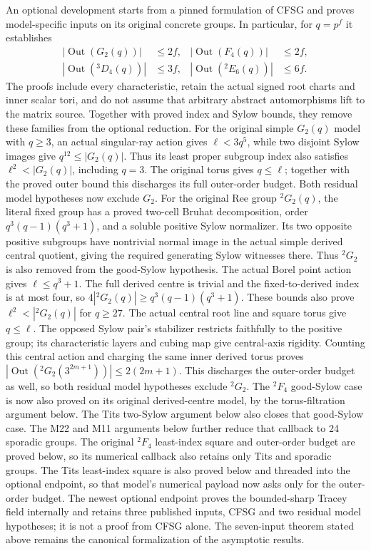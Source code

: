 An optional development starts from a pinned formulation of CFSG and
proves model-specific inputs on its original concrete groups. In
particular, for $q=p^f$ it establishes
\[
 \begin{aligned}
 |\operatorname{Out}(G_2(q))|&\leq2f,&
 |\operatorname{Out}(F_4(q))|&\leq2f,\\
 |\operatorname{Out}({}^3D_4(q))|&\leq3f,&
 |\operatorname{Out}({}^2E_6(q))|&\leq6f.
 \end{aligned}
\]
The proofs include every characteristic, retain the actual signed root
charts and inner scalar tori, and do not assume that arbitrary abstract
automorphisms lift to the matrix source. Together with proved index and
Sylow bounds, they remove these families from the optional reduction.
For the original simple $G_2(q)$ model with $q\geq3$, an actual
singular-ray action gives $\ell<3q^5$, while two disjoint Sylow images
give $q^{12}\leq|G_2(q)|$. Thus its least proper subgroup index also
satisfies $\ell^2<|G_2(q)|$, including $q=3$. The original torus gives
$q\leq\ell$; together with the proved outer bound this discharges its
full outer-order budget. Both residual model hypotheses now exclude
$G_2$. For the original Ree group ${}^2G_2(q)$, the literal fixed group
has a proved two-cell Bruhat decomposition, order
$q^3(q-1)(q^3+1)$, and a soluble positive Sylow normalizer. Its two
opposite positive subgroups have nontrivial normal image in the actual
simple derived central quotient, giving the required generating Sylow
witnesses there. Thus ${}^2G_2$ is also removed from the good-Sylow
hypothesis. The actual Borel point action gives $\ell\leq q^3+1$.
The full derived centre is trivial and the fixed-to-derived index is at
most four, so
$4|{}^2G_2(q)|\geq q^3(q-1)(q^3+1)$. These bounds also prove
$\ell^2<|{}^2G_2(q)|$ for $q\geq27$. The actual central root line
and square torus give $q\leq\ell$. The opposed Sylow pair's stabilizer
restricts faithfully to the positive group; its characteristic layers
and cubing map give central-axis rigidity. Counting this central action
and charging the same inner derived torus proves
$|\operatorname{Out}({}^2G_2(3^{2m+1}))|\leq2(2m+1)$.
This discharges the outer-order budget as well, so both residual model
hypotheses exclude ${}^2G_2$. The ${}^2F_4$ good-Sylow case is now also
proved on its original derived-centre model, by the torus-filtration
argument below. The Tits two-Sylow argument below also closes that
good-Sylow case. The M22 and M11 arguments below further reduce that
callback to 24 sporadic groups. The original ${}^2F_4$ least-index square and
outer-order budget are proved below, so its numerical callback also
retains only Tits and sporadic groups. The Tits least-index square is
also proved below and threaded into the optional endpoint, so that
model's numerical payload now asks only for the outer-order budget.
The newest optional endpoint proves the bounded-sharp Tracey field
internally and retains three published inputs, CFSG and two residual model
hypotheses; it is not a proof from CFSG alone. The seven-input theorem stated above remains the canonical
formalization of the asymptotic results.

